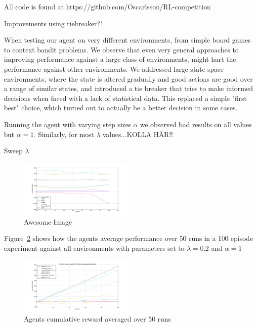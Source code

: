 All code is found at https://github.com/Oscarlsson/RL-competition

Improvements using tiebreaker?!

When testing our agent on very different environments, from simple board games to context bandit problems. We observe that even very general approaches to improving performance against a large class of environments, might hurt the performance against other environments. We addressed large state space environments, where the state is altered gradually and good actions are good over a range of similar states, and introduced a tie breaker that tries to make informed decisions when faced with a lack of statistical data. This replaced a simple "first best" choice, which turned out to actually be a better decision in some cases. 

Running the agent with varying step sizes $\alpha$ we observed bad results on all values but $\alpha=1$. Similarly, for most $\lambda$ values...KOLLA HÄR!!


Sweep $\lambda$
\begin{figure}[h]
    \centering
    \includegraphics[width=0.5\textwidth]{../data/lambdasweepplot.png}
    \caption{Awesome Image}
    \label{fig:awesome_image}
\end{figure}


Figure~\ref{fig:cumreward} shows how the agents average performance over 50 runs in a 100 episode experiment against all environments with parameters set to $\lambda = 0.2$ and $\alpha = 1$

\begin{figure}[h!]
    \centering
    \includegraphics[width=0.5\textwidth]{../data/100episodes_50runs.png}
    \caption{Agents cumulative reward averaged over 50 runs}
    \label{fig:cumreward}
\end{figure}

